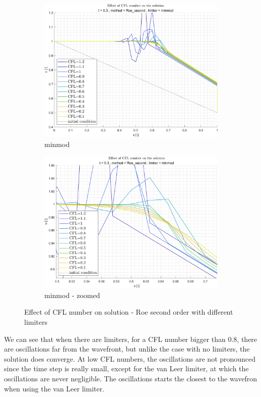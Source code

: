 \documentclass[11pt, a4paper]{article}
\begin{document}
\begin{figure}[H]
\begin{subfigure}[c]{.35\textwidth}
        \includegraphics[width=\textwidth]{images/grap6.png}
        \caption{minmod}
        \label{fig:roe_second_minmod_A}
    \end{subfigure}
    \begin{subfigure}[c]{.35\textwidth}
        \centering
        \includegraphics[width=\textwidth]{images/grap6.1.png}
        \caption{minmod - zoomed}
        \label{fig:roe_second_minmod_B}
    \end{subfigure}
    \caption{Effect of CFL number on solution - Roe second order with different limiters}
    \label{fig:roe_second_with_limiters}
\end{figure}
\noindent We can see that when there are limiters, for a CFL number bigger than 0.8, there are oscillations far from the wavefront, but unlike the case with no limiters, the solution does converge. At low CFL numbers, the oscillations are not pronounced since the time step is really small, except for the van Leer limiter, at which the oscillations are never negligible. The oscillations starts the closest to the wavefron when using the van Leer limiter. 
\end{document}

